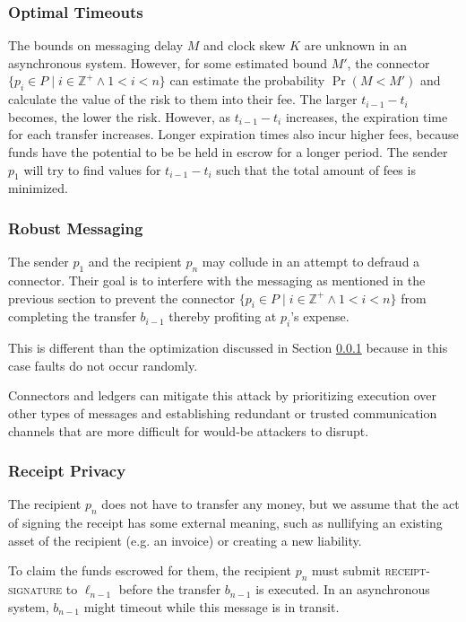 \documentclass[letterpaper,twocolumn,10pt]{article}
\begin{document}
\subsubsection{Optimal Timeouts}
\label{subsubsec:optimal-timeouts}

The bounds on messaging delay $M$ and clock skew $K$ are unknown in an asynchronous system. However, for some estimated bound $M'$, the connector $ \{ p_i \in P \mid i \in \mathbb{Z}^+ \land 1 < i < n \} $ can estimate the probability $\Pr(M < M')$ and calculate the value of the risk to them into their fee. The larger $t_{i-1} - t_i$ becomes, the lower the risk. However, as $t_{i-1} - t_i$ increases, the expiration time for each transfer increases. Longer expiration times also incur higher fees, because funds have the potential to be be held in escrow for a longer period. The sender $p_1$ will try to find values for $t_{i-1} - t_i$ such that the total amount of fees is minimized.

\subsubsection{Robust Messaging}

The sender $p_1$ and the recipient $p_n$ may collude in an attempt to defraud a connector. Their goal is to interfere with the messaging as mentioned in the previous section to prevent the connector $ \{ p_i \in P \mid i \in \mathbb{Z}^+ \land 1 < i < n \} $ from completing the transfer $b_{i-1}$ thereby profiting at $p_i$'s expense.

This is different than the optimization discussed in Section \ref{subsubsec:optimal-timeouts} because in this case faults do not occur randomly.

Connectors and ledgers can mitigate this attack by prioritizing execution over other types of messages and establishing redundant or trusted communication channels that are more difficult for would-be attackers to disrupt.

\subsubsection{Receipt Privacy}

The recipient $p_n$ does not have to transfer any money, but we assume that the act of signing the receipt has some external meaning, such as nullifying an existing asset of the recipient (e.g. an invoice) or creating a new liability.

To claim the funds escrowed for them, the recipient $p_n$ must submit \textsc{receipt-signature} to $\ell_{n-1}$ before the transfer $b_{n-1}$ is executed. In an asynchronous system, $b_{n-1}$ might timeout while this message is in transit.
\end{document}
